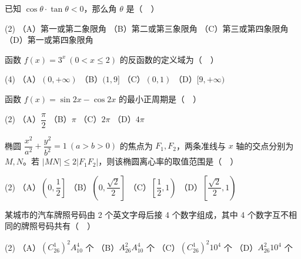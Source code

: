


\begin{question}
已知 $\cos\theta\cdot\tan\theta<0$，那么角 $\theta$ 是（　）

\begin{gkopts}(2)
\task （A）第一或第二象限角
\task （B）第二或第三象限角
\task （C）第三或第四象限角
\task （D）第一或第四象限角
\end{gkopts}

\end{question}
\begin{question}
函数 $f(x)=3^x\ (0<x\leq 2)$ 的反函数的定义域为（　）

\begin{gkopts}(4)
\task （A）$(0,+\infty)$
\task （B）$(1,9]$
\task （C）$(0,1)$
\task （D）$[9,+\infty)$
\end{gkopts}

\end{question}
\begin{question}
函数 $f(x)=\sin 2x-\cos 2x$ 的最小正周期是（　）

\begin{gkopts}(2)
\task （A）$\dfrac{\pi}{2}$
\task （B）$\pi$
\task （C）$2\pi$
\task （D）$4\pi$
\end{gkopts}

\end{question}
\begin{question}
椭圆 $\dfrac{x^2}{a^2}+\dfrac{y^2}{b^2}=1\ (a>b>0)$ 的焦点为 $F_1,F_2$，两条准线与 $x$ 轴的交点分别为 $M,N$。若 $|MN|\leq 2|F_1F_2|$，则该椭圆离心率的取值范围是（　）

\begin{gkopts}(2)
\task （A）$\left(0,\dfrac{1}{2}\right]$
\task （B）$\left(0,\dfrac{\sqrt{2}}{2}\right]$
\task （C）$\left[\dfrac{1}{2},1\right)$
\task （D）$\left[\dfrac{\sqrt{2}}{2},1\right)$
\end{gkopts}

\end{question}
\begin{question}
某城市的汽车牌照号码由 2 个英文字母后接 4 个数字组成，其中 4 个数字互不相同的牌照号码共有（　）

\begin{gkopts}(2)
\task （A）$(C_{26}^{1})^2A_{10}^{4}$ 个
\task （B）$A_{26}^{2}A_{10}^{4}$ 个
\task （C）$(C_{26}^{1})^2 10^4$ 个
\task （D）$A_{26}^{2}10^4$ 个
\end{gkopts}

\end{question}
